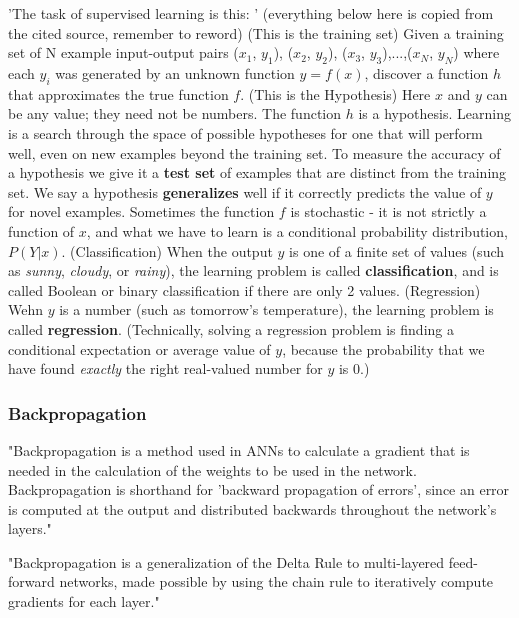 'The task of supervised learning is this: ' \cite{russell2016artificial} (everything below here is copied from the cited source, remember to reword)
(This is the training set)
Given a training set of N example input-output pairs
($x_1$, $y_1$), ($x_2$, $y_2$), ($x_3$, $y_3$),...,($x_N$, $y_N$)
where each $y_i$ was generated by an unknown function $y=f(x)$, discover a function $h$ that approximates the true function $f$.
(This is the Hypothesis)
Here $x$ and $y$ can be any value; they need not be numbers. The function $h$ is a hypothesis. Learning is a search through the space of possible hypotheses for one that will perform well, even on new examples beyond the training set. To measure the accuracy of a hypothesis we give it a \textbf{test set} of examples that are distinct from the training set. We say a hypothesis \textbf{generalizes} well if it correctly predicts the value of $y$ for novel examples. Sometimes the function $f$ is stochastic - it is not strictly a function of $x$, and what we have to learn is a conditional probability distribution, $P(Y|x)$.
(Classification)
When the output $y$ is one of a finite set of values (such as \textit{sunny}, \textit{cloudy}, or \textit{rainy}), the learning problem is called \textbf{classification}, and is called Boolean or binary classification if there are only 2 values.
(Regression)
Wehn $y$ is a number (such as tomorrow's temperature), the learning problem is called \textbf{regression}. (Technically, solving a regression problem is finding a conditional expectation or average value of $y$, because the probability that we have found \textit{exactly} the right real-valued number for $y$ is 0.)



\subsubsection{Backpropagation}

"Backpropagation is a method used in ANNs to calculate a gradient that is needed in the calculation of the weights to be used in the network. Backpropagation is shorthand for 'backward propagation of errors', since an error is computed at the output and distributed backwards throughout the network's layers."

"Backpropagation is a generalization of the Delta Rule to multi-layered feed-forward networks, made possible by using the chain rule to iteratively compute gradients for each layer."

